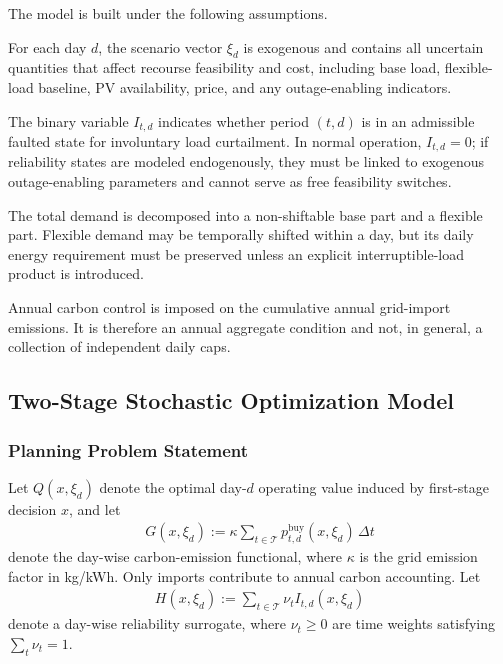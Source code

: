 The model is built under the following assumptions.

\begin{assumption}
For each day \(d\), the scenario vector \(\xi_d\) is exogenous and contains all uncertain quantities that affect recourse feasibility and cost, including base load, flexible-load baseline, PV availability, price, and any outage-enabling indicators.
\end{assumption}

\begin{assumption}
The binary variable \(I_{t,d}\) indicates whether period \((t,d)\) is in an admissible faulted state for involuntary load curtailment. In normal operation, \(I_{t,d}=0\); if reliability states are modeled endogenously, they must be linked to exogenous outage-enabling parameters and cannot serve as free feasibility switches.
\end{assumption}

\begin{assumption}
The total demand is decomposed into a non-shiftable base part and a flexible part. Flexible demand may be temporally shifted within a day, but its daily energy requirement must be preserved unless an explicit interruptible-load product is introduced.
\end{assumption}

\begin{assumption}
Annual carbon control is imposed on the cumulative annual grid-import emissions. It is therefore an annual aggregate condition and not, in general, a collection of independent daily caps.
\end{assumption}

\subsection{Two-Stage Stochastic Optimization Model}

\subsubsection{Planning Problem Statement}

Let \(Q(x,\xi_d)\) denote the optimal day-\(d\) operating value induced by first-stage decision \(x\), and let
\begin{align}
G(x,\xi_d) := \kappa \sum_{t\in\mathcal{T}} p^{\mathrm{buy}}_{t,d}(x,\xi_d)\,\Delta t
\label{eq:10a-carbon-functional}
\end{align}
denote the day-wise carbon-emission functional, where \(\kappa\) is the grid emission factor in kg/kWh. Only imports contribute to annual carbon accounting. Let
\begin{align}
H(x,\xi_d) := \sum_{t\in\mathcal{T}} \nu_t I_{t,d}(x,\xi_d)
\label{eq:10a-reliability-functional}
\end{align}
denote a day-wise reliability surrogate, where \(\nu_t\ge 0\) are time weights satisfying \(\sum_t \nu_t=1\).

